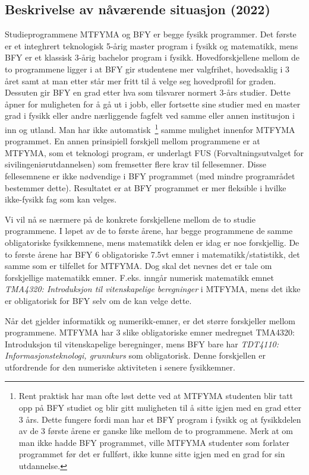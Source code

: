 \subsection{Beskrivelse av nåværende situasjon (2022)}
Studieprogrammene MTFYMA og BFY er begge fysikk programmer. Det første er et integhrert teknologisk 5-årig master program i fysikk og matematikk, mens BFY er et klassisk 3-årig bachelor program i fysikk. Hovedforskjellene mellom de to programmene ligger i at BFY gir studentene mer valgfrihet, hovedsaklig i 3 året samt at man etter står mer fritt til å velge seg hovedprofil for graden. Dessuten gir BFY en grad etter hva som tilsvarer normert 3-års studier. Dette åpner for muligheten for å gå ut i jobb, eller fortsette sine studier med en master grad i fysikk eller andre nærliggende fagfelt ved samme eller annen institusjon i inn og utland. Man har ikke automatisk~\footnote{Rent praktisk har man ofte løst dette ved at MTFYMA studenten blir tatt opp på BFY studiet og blir gitt muligheten til å sitte igjen med en grad etter 3 års. Dette fungere fordi man har et BFY program i fysikk og at fysikkdelen av de 3 første årene er ganske like mellom de to programmene. Merk at om man ikke hadde BFY programmet, ville MTFYMA studenter som forlater programmet før det er fullført, ikke kunne sitte igjen med en grad for sin utdannelse.} samme mulighet innenfor MTFYMA programmet. En annen prinsipiell forskjell mellom programmene er at MTFYMA, som et teknologi program, er underlagt FUS (Forvaltningsutvalget for sivilingeniørutdannelsen) som fremsetter flere krav til fellesemner. Disse fellesemnene er ikke nødvendige i BFY programmet (med mindre programrådet bestemmer dette). Resultatet er at BFY programmet er mer fleksible i hvilke ikke-fysikk fag som kan velges. 

Vi vil nå se nærmere på de konkrete forskjellene mellom de to studie programmene. I løpet av de to første årene, har begge programmene de samme obligatoriske fysikkemnene, mens matematikk delen er idag er noe forskjellig. De to første årene har BFY 6 obligatoriske 7.5vt emner i matematikk/statistikk, det samme som er tilfellet for MTFYMA. Dog skal det nevnes det er tale om forskjellige matematikk emner. F.eks. inngår numerisk matematikk emnet \textit{TMA4320: Introduksjon til vitenskapelige beregninger} i MTFYMA, mens det ikke er obligatorisk for BFY selv om de kan velge dette.

Når det gjelder informatikk og numerikk-emner, er det større forskjeller mellom programmene. MTFYMA har 3 slike obligatoriske emner medregnet TMA4320: Introduksjon til vitenskapelige beregninger, mens BFY bare har \textit{TDT4110: Informasjonsteknologi, grunnkurs} som obligatorisk. Denne forskjellen er utfordrende for den numeriske aktiviteten i senere fysikkemner.

